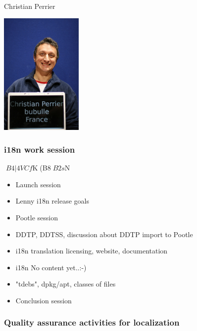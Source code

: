 \documentclass[cjk,dvipdfmx,12pt]{beamer}
\begin{document}
{{{{{{{{\begin{frame}
\begin{minipage}{0.4\hsize}
\begin{itemize}
	Christian Perrier
    \end{itemize}
  \end{minipage}
  \begin{minipage}{0.4\hsize}
    \includegraphics[width=4cm]{image200707/bubulle.jpg}  
  \end{minipage}
\end{frame}

\begin{frame}
\frametitle{i18n work session} 
$B4|4VCf$K(B8$B2s$N%

  \begin{itemize}
     \item Launch session
     \item Lenny i18n release goals
     \item Pootle session
     \item DDTP, DDTSS, discussion about DDTP import to Pootle
     \item i18n  translation licensing, website, documentation
     \item i18n No content yet..:-)
     \item "tdebs", dpkg/apt, classes of files
     \item Conclusion session    
    
  \end{itemize}
\end{frame}

\begin{frame}
\frametitle{Quality assurance activities for localization} 
  \begin{minipage}{0.4\hsize}
\end{minipage}
\end{frame}}}}}}}}}
\end{document}

